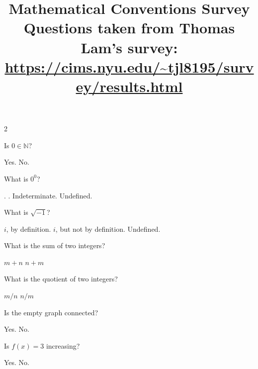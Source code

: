 \documentclass[a4paper,12pt]{exam}
\title{Mathematical Conventions Survey \\
\small Questions taken from Thomas Lam's survey: \url{https://cims.nyu.edu/~tjl8195/survey/results.html}}
\date{}
\begin{document}
\maketitle


\thispagestyle{headandfoot}
\vspace{-0.75in}


\begin{multicols}{2}
\begin{questions}

		\begin{samepage}
		\question Is $0\in \mathbb{N}$?
        \begin{checkboxes}
            \choice Yes.
            \choice No.
        \end{checkboxes}
        \end{samepage}
        
        \begin{samepage}
    \question What is $0^0$? 
        \begin{checkboxes}
            .
            .
            \choice Indeterminate.
            \choice Undefined.
        \end{checkboxes}
			\end{samepage}
    \question What is $\sqrt{-1}$? 
        \begin{checkboxes}
            \choice $i$, by definition.
            \choice $i$, but not by definition.
            \choice Undefined.
        \end{checkboxes}

    \question What is the sum of two integers? 
        \begin{checkboxes}
            \choice $m+n$
            \choice $n+m$
        \end{checkboxes}

    \question What is the quotient of two integers?
        \begin{checkboxes}
            \choice $m/n$
            \choice $n/m$
        \end{checkboxes}

    \question Is the empty graph connected?
        \begin{checkboxes}
            \choice Yes.
            \choice No.
        \end{checkboxes}

    \question Is $f(x)=3$ increasing?
        \begin{checkboxes}
            \choice Yes.
            \choice No.
        \end{checkboxes}


\end{questions}
\end{multicols}
\end{document}
